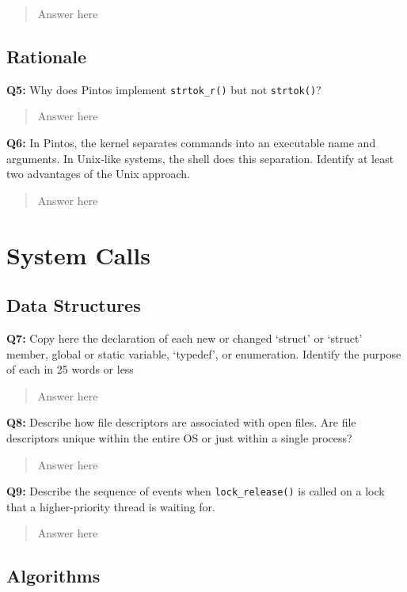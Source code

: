 \documentclass[a4paper,11pt]{paper}
\begin{document}
\begin{quote}
  Answer here
\end{quote}

\subsection{Rationale}

\textbf{Q5:} Why does Pintos implement \texttt{strtok\_r()} but not \texttt{strtok()}?
\begin{quote}
  Answer here
\end{quote}

\textbf{Q6:} In Pintos, the kernel separates commands into an executable name and arguments.  In Unix-like systems, the shell does this separation.  Identify at least two advantages of the Unix approach.
\begin{quote}
  Answer here
\end{quote}


\section{System Calls}

\subsection{Data Structures}

\textbf{Q7:} Copy here the declaration of each new or changed `struct' or `struct' member, global or static variable, `typedef', or enumeration.  Identify the purpose of each in 25 words or less
\begin{quote}
  Answer here
\end{quote}

\textbf{Q8:} Describe how file descriptors are associated with open files. Are file descriptors unique within the entire OS or just within a single process?
\begin{quote}
  Answer here
\end{quote}

\textbf{Q9:} Describe the sequence of events when \texttt{lock\_release()} is called on a lock that a higher-priority thread is waiting for.
\begin{quote}
  Answer here
\end{quote}

\subsection{Algorithms}
\end{document}
